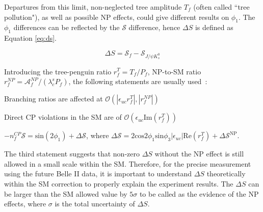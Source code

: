 Departures from this limit, non-neglected tree amplitude $T_f$ (often called ``tree pollution"), as well as possible NP effects, could give different results on $\phi_1$. The $\phi_1$ differences can be reflected by the $\mathcal{S}$ difference, hence $\Delta S$ is defined as Equation \ref{eq:ds}.

\begin{equation}\label{eq:ds}
\Delta S = \mathcal{S}_{f} - \mathcal{S}_{J/\psi K^0_s}
\end{equation}

Introducing the tree-penguin ratio $r^T_f = T_f / P_f$, NP-to-SM ratio $r^{NP}_f = \mathcal{A}^{NP}_f / (\lambda^s_c P_f)$, the following statements are usually used~\cite{b2book}:

\textbullet \space Branching ratios are affected at $\mathcal{O}(|\epsilon_{uc}r^T_f|,|r^{NP}_f|)$

\textbullet \space Direct CP violations in the SM are of $\mathcal{O}(\epsilon_{uc}\text{Im}(r^T_f))$


\textbullet \space $-n^{CP}_f\mathcal{S} = \text{sin}(2\phi_1) + \Delta \mathcal{S}$, where
$\Delta \mathcal{S}=2\text{cos}2\phi_1 \text{sin}\phi_3 |\epsilon_{uc}| \text{Re}(r^T_f) + \Delta \mathcal{S}^\text{NP}$.

The third statement suggests that non-zero $\Delta S$ without the NP effect is still allowed in a small scale within the SM.
Therefore, for the precise measurement using the future Belle II data, it is important to understand $\Delta S$ theoretically within the SM correction to properly explain the experiment results. The $\Delta S$ can be larger than the SM allowed value by $5\sigma$ to be called as the evidence of the NP effects, where $\sigma$ is the total uncertainty of $\Delta S$.

